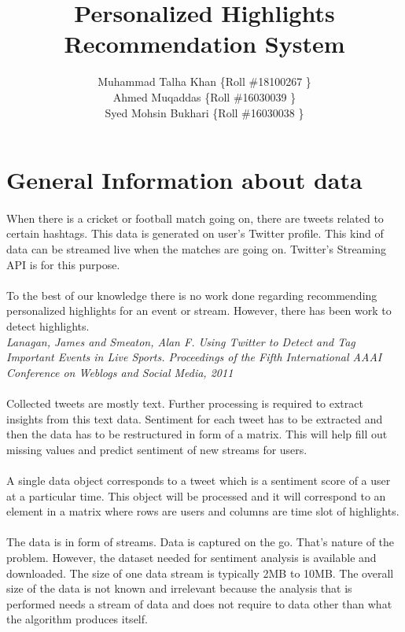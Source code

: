 \documentclass[11pt]{article}
\title{Personalized Highlights Recommendation System}
\author{Muhammad Talha Khan \{Roll \#18100267 \}\\Ahmed Muqaddas \{Roll \#16030039 \}\\Syed Mohsin Bukhari \{Roll \#16030038 \}}
\begin{document}
\maketitle

\section{General Information about data}
\paragraph{}
When there is a cricket or football match going on, there are tweets related to certain hashtags. This data is generated on user's Twitter profile. This kind of data can be streamed live when the matches are going on. Twitter's Streaming API is for this purpose.
\paragraph{}
To the best of our knowledge there is no work done regarding recommending personalized highlights for an event or stream. However, there has been work to detect highlights.\\
\textit{Lanagan, James and Smeaton, Alan F. Using Twitter to Detect and Tag Important Events in Live Sports. Proceedings of the Fifth International AAAI Conference on Weblogs and Social Media, 2011}
\paragraph{}
Collected tweets are mostly text. Further processing is required to extract insights from this text data. Sentiment for each tweet has to be extracted and then the data has to be restructured in form of a matrix. This will help fill out missing values and predict sentiment of new streams for users.
\paragraph{}
A single data object corresponds to a tweet which is a sentiment score of a user at a particular time. This object will be processed and it will correspond to an element in a matrix where rows are users and columns are time slot of highlights.
\paragraph{}
The data is in form of streams. Data is captured on the go. That's nature of the problem. However, the dataset needed for sentiment analysis is available and downloaded. The size of one data stream is typically 2MB to 10MB. The overall size of the data is not known and irrelevant because the analysis that is performed needs a stream of data and does not require to data other than what the algorithm produces itself.
\end{document}
